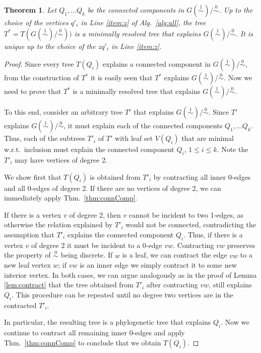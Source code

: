 \documentclass[smallextended]{svjour3}
\newcommand{\rev}[1]{\begingroup\color{blue}#1\endgroup}
\newcommand{\Ro}{\mathrel{\overset{0}{\sim}}}
\newcommand{\Rl}{\mathrel{\overset{1}{\sim}}}
\newtheorem{thm}{Theorem}
\begin{document}
\begin{thm}
  Let $Q_1,\dots Q_k$ be the connected components in $G(\Rl)/\Ro$.  Up to
  the choice of the vertices $q'_i$ in Line \ref{item:z} of Alg.\
  \ref{alg:all}, the tree $T^* = T(G(\Rl)/\Ro))$ is a \rev{minimally
    resolved tree that explains $G(\Rl)/\Ro$. It is unique up to the choice
    of the $zq'_i$ in Line \ref{item:z}.}
  \label{thm:star-tree}
\end{thm}
\begin{proof}
 \rev{ Since every tree $T(Q_i)$ explains a connected component in $G(\Rl)/\Ro$,
  from the construction of $T^*$ it is easily seen that $T^*$ explains
  $G(\Rl)/\Ro$.  Now we need to prove that $T^*$ is a minimally resolved
  tree that explains $G(\Rl)/\Ro$.

  To this end, consider an arbitrary tree $T'$ that explains $G(\Rl)/\Ro$.
  Since $T'$ explains $G(\Rl)/\Ro$, it must explain each of the connected
  components $Q_1,\dots Q_k$. Thus, each of the subtrees $T'_i$ of $T'$
  with leaf set $V(Q_i)$ that are minimal w.r.t.\ inclusion must explain
  the connected component $Q_i$, $1\le i \le k$.  Note the $T'_i$ may have
  vertices of degree 2.

  We show first that $T(Q_i)$ is obtained from $T'_i$ by contracting all
  inner 0-edges and all 0-edges of degree 2.  If there are no vertices of
  degree 2, we can immediately apply Thm.\ \ref{thm:connComp}.
  	
  If there is a vertex $v$ of degree 2, then $v$ cannot be incident to two
  1-edges, as otherwise the relation explained by $T'_i$ would not be
  connected, contradicting the assumption that $T'_i$ explains the
  connected component $Q_i$.  Thus, if there is a vertex $v$ of degree 2 it
  must be incident to a 0-edge $vw$.  Contracting $vw$ preserves the
  property of $\Ro$ being discrete.  If $w$ is a leaf, we can contract the
  edge $vw$ to a new leaf vertex $w$; if $vw$ is an inner edge we simply
  contract it to some new interior vertex. In both cases, we can argue
  analogously as in the proof of Lemma \ref{lem:contract} that the tree
  obtained from $T'_i$ after contracting $vw$, still explains $Q_i$.  This
  procedure can be repeated until no degree two vertices are in the
  contracted $T'_i$.

  In particular, the resulting tree is a phylogenetic tree that explains
  $Q_i$. Now we continue to contract all remaining inner 0-edges and apply
  Thm.\ \ref{thm:connComp} to conclude that we obtain $T(Q_i)$.

}
\end{proof}
\end{document}
